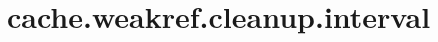 \section{cache.weakref.cleanup.interval}
\label{configuration:CacheWeakrefCleanupInterval}
\AvailableInCsharpOnly{\TODO}
